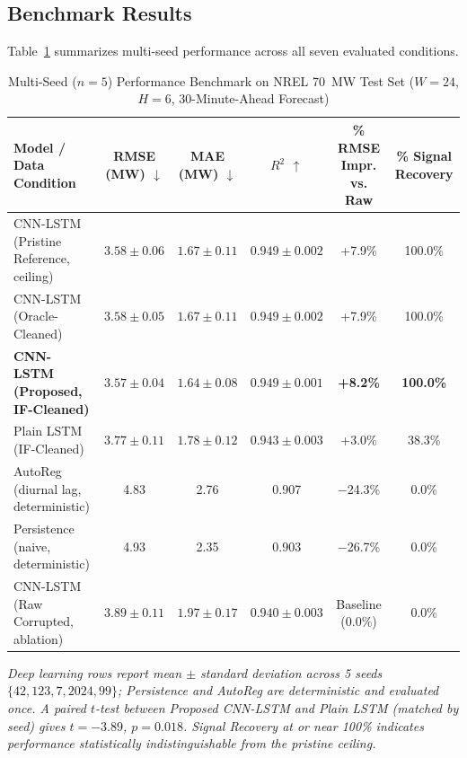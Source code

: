 \documentclass[conference]{IEEEtran}
\begin{document}
\subsection{Benchmark Results}
Table~\ref{tab:results} summarizes multi-seed performance across all seven evaluated conditions.

\begin{table}[!t]
\centering
\caption{Multi-Seed ($n=5$) Performance Benchmark on NREL 70~MW Test Set ($W{=}24$, $H{=}6$, 30-Minute-Ahead Forecast)}
\label{tab:results}
\begin{tabular}{@{}lccccc@{}}
\toprule
\textbf{Model / Data Condition} & \textbf{RMSE (MW) $\downarrow$} & \textbf{MAE (MW) $\downarrow$} & \textbf{$R^2$ $\uparrow$} & \textbf{\% RMSE Impr. vs. Raw} & \textbf{\% Signal Recovery} \\
\midrule
CNN-LSTM (Pristine Reference, ceiling) & $3.58 \pm 0.06$ & $1.67 \pm 0.11$ & $0.949 \pm 0.002$ & +7.9\% & 100.0\% \\
CNN-LSTM (Oracle-Cleaned)              & $3.58 \pm 0.05$ & $1.67 \pm 0.11$ & $0.949 \pm 0.002$ & +7.9\% & 100.0\% \\
\textbf{CNN-LSTM (Proposed, IF-Cleaned)} & $\mathbf{3.57 \pm 0.04}$ & $\mathbf{1.64 \pm 0.08}$ & $\mathbf{0.949 \pm 0.001}$ & \textbf{+8.2\%} & \textbf{100.0\%} \\
Plain LSTM (IF-Cleaned)                & $3.77 \pm 0.11$ & $1.78 \pm 0.12$ & $0.943 \pm 0.003$ & +3.0\% & 38.3\% \\
AutoReg (diurnal lag, deterministic)   & 4.83 & 2.76 & 0.907 & $-$24.3\% & 0.0\% \\
Persistence (naive, deterministic)     & 4.93 & 2.35 & 0.903 & $-$26.7\% & 0.0\% \\
CNN-LSTM (Raw Corrupted, ablation)     & $3.89 \pm 0.11$ & $1.97 \pm 0.17$ & $0.940 \pm 0.003$ & Baseline (0.0\%) & 0.0\% \\
\bottomrule
\end{tabular}

\vspace{3pt}
\footnotesize{\textit{Deep learning rows report mean $\pm$ standard deviation across 5 seeds $\{42, 123, 7, 2024, 99\}$; Persistence and AutoReg are deterministic and evaluated once. A paired $t$-test between Proposed CNN-LSTM and Plain LSTM (matched by seed) gives $t=-3.89$, $p=0.018$. Signal Recovery at or near 100\% indicates performance statistically indistinguishable from the pristine ceiling.}}
\end{table}
\end{document}
